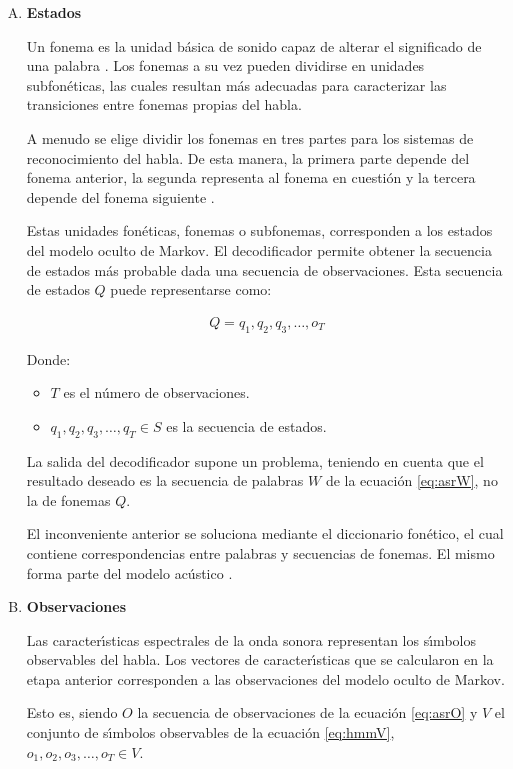 \begin{enumerate}[A)]
	\item \textbf{Estados}


	Un fonema es la unidad b\'asica de sonido capaz de alterar el significado de una palabra \cite{Armbruster2003}.
	Los fonemas a su vez pueden dividirse en unidades subfon\'eticas, las cuales resultan m\'as adecuadas para
	caracterizar las transiciones entre fonemas propias del habla.

	A menudo se elige dividir los fonemas en tres partes para los sistemas de reconocimiento del habla.
	De esta manera, la primera parte depende del fonema anterior, la segunda representa al fonema en cuesti\'on
	y la tercera depende del fonema siguiente \cite{CMUConcepts}.

	Estas unidades fon\'eticas, fonemas o subfonemas, corresponden a los estados del modelo oculto de Markov.
	El decodificador permite obtener la secuencia de estados m\'as probable dada una secuencia de observaciones.
	Esta secuencia de estados $Q$ puede representarse como:

	\begin{align}
		Q = q_1,q_2,q_3,\ldots,o_T\label{eq:hmmQ}
	\end{align}

	Donde:
	\begin{itemize}
		\item $T$ es el n\'umero de observaciones.
		\item $q_1,q_2,q_3,\ldots,q_T \in S$ es la secuencia de estados.
	\end{itemize}

	La salida del decodificador supone un problema, teniendo en cuenta que el resultado deseado es la secuencia 
	de palabras $W$ de la ecuaci\'on \ref{eq:asrW}, no la de fonemas $Q$.

	El inconveniente anterior se soluciona mediante el diccionario fon\'etico, el cual contiene correspondencias entre palabras y secuencias de fonemas. El mismo forma parte del modelo ac\'ustico \cite{huang-handbook10}.

	\item \textbf{Observaciones}


	Las caracter{\'\i}sticas espectrales de la onda sonora representan los s{\'\i}mbolos observables del habla.
	Los vectores de caracter{\'\i}sticas que se calcularon en la etapa anterior corresponden a las observaciones
	del modelo oculto de Markov.

	Esto es, siendo $O$ la secuencia de observaciones de la ecuaci\'on \ref{eq:asrO} 
	y $V$ el conjunto de s{\'\i}mbolos observables de la ecuaci\'on \ref{eq:hmmV}, $o_1,o_2,o_3,\ldots,o_T \in V$.


\end{enumerate}
